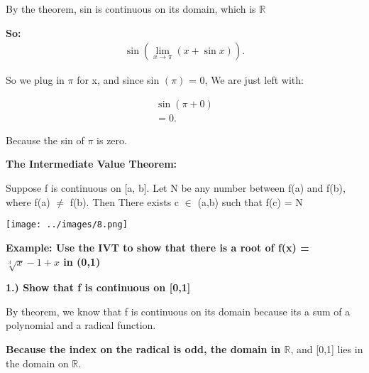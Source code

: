\documentclass{report}
\begin{document}
        \bigbreak \noindent 
        By the theorem, sin is continuous on its domain, which is $\mathbb{R}$

        \bigbreak \noindent 
        \textbf{So:}
        \begin{align*}
            \sin \left( \lim\limits_{x \to \pi}{ \left(x + \sin x\right)}\right) 
        .\end{align*}

        \bigbreak \noindent 
        So we plug in $\pi$ for x, and since sin $\left(\pi\right)$ = 0, We are just left with:

        \begin{align*}
            \sin \left(\pi+0\right) \\ 
            = 0 
        .\end{align*}

        \bigbreak \noindent 
        Because the sin of $\pi$ is zero.

        \pagebreak
        \begin{Large}
            \noindent \textbf{The Intermediate Value Theorem:}
        \end{Large}

        \bigbreak \noindent \bigbreak \noindent 
        Suppose f is continuous on [a, b]. Let N be any number between f(a) and f(b), where
        f(a) $\neq$ f(b). Then There exists c $\in$ (a,b) such that f(c) = N

        \bigbreak \noindent \bigbreak \noindent 
        \begin{center}
            \texttt{[image: ../images/8.png]}
        \end{center}

        \bigbreak \noindent \bigbreak \noindent 
        \begin{large}
            \noindent \textbf{Example: Use the IVT to show that there is a root of f(x) = $\sqrt[3]{x} -1 + x$ in (0,1)}
        \end{large}

        \bigbreak \noindent \bigbreak \noindent \bigbreak \noindent 
        \textbf{1.) Show that f is continuous on [0,1]}

        \bigbreak \noindent 
        By theorem, we know that f is continuous on its domain because its a sum of a polynomial
        and a radical function.

        \bigbreak \noindent 
        \textbf{Because the index on the radical is odd, the domain in $\mathbb{R}$}, and [0,1] 
        lies in the domain on $\mathbb{R}$.
\end{document}
